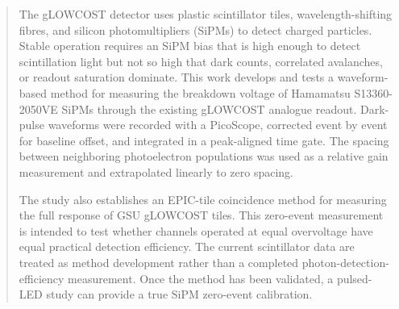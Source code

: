 \begin{abstract}
The gLOWCOST detector uses plastic scintillator tiles, wavelength-shifting fibres, and silicon photomultipliers (SiPMs) to detect charged particles. Stable operation requires an SiPM bias that is high enough to detect scintillation light but not so high that dark counts, correlated avalanches, or readout saturation dominate. This work develops and tests a waveform-based method for measuring the breakdown voltage of Hamamatsu S13360-2050VE SiPMs through the existing gLOWCOST analogue readout. Dark-pulse waveforms were recorded with a PicoScope, corrected event by event for baseline offset, and integrated in a peak-aligned time gate. The spacing between neighboring photoelectron populations was used as a relative gain measurement and extrapolated linearly to zero spacing.

The study also establishes an EPIC-tile coincidence method for measuring the full response of GSU gLOWCOST tiles. This zero-event measurement is intended to test whether channels operated at equal overvoltage have equal practical detection efficiency. The current scintillator data are treated as method development rather than a completed photon-detection-efficiency measurement. Once the method has been validated, a pulsed-LED study can provide a true SiPM zero-event calibration.
\end{abstract}
